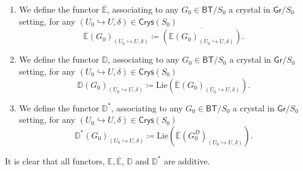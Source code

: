\begin{defn}[]\leavevmode\vspace{-.2\baselineskip}
\begin{enumerate}
\item We define the functor $\overline{\mathbb{E}}$, associating to
	any $G_0 \in \mathsf{BT}/S_0$ a crystal in $\mathsf{Gr}/S_0$
	setting, for any $\left(U_0 \hookrightarrow U, \delta\right) \in \mathsf{Crys}(S_0)$
	\begin{equation*}
		\overline{\mathbb{E}}(G_0)_{\left(U_0 \hookrightarrow U, \delta\right)} \coloneqq
		\overline{\left( \mathbb{E}(G_0)_{\left(U_0 \hookrightarrow U, \delta\right)} \right)}
	.\end{equation*}

\item We define the functor $\mathbb{D}$, associating to
	any $G_0 \in \mathsf{BT}/S_0$ a crystal in $\mathsf{Gr}/S_0$
	setting, for any $\left(U_0 \hookrightarrow U, \delta\right) \in \mathsf{Crys}(S_0)$
	\begin{equation*}
		\mathbb{D}(G_0)_{\left(U_0 \hookrightarrow U, \delta\right)} \coloneqq
		\mathrm{Lie}
		\left( \overline{\mathbb{E}}(G_0)_{\left(U_0 \hookrightarrow U, \delta\right)} \right)
	.\end{equation*}

\item We define the functor $\mathbb{D}^*$, associating to
	any $G_0 \in \mathsf{BT}/S_0$ a crystal in $\mathsf{Gr}/S_0$
	setting, for any $\left(U_0 \hookrightarrow U, \delta\right) \in \mathsf{Crys}(S_0)$
	\begin{equation*}
		\mathbb{D}^*(G_0)_{\left(U_0 \hookrightarrow U, \delta\right)} \coloneqq
		\mathrm{Lie}
		\left( \overline{\mathbb{E}}(G_0^D)_{\left(U_0 \hookrightarrow U, \delta\right)} \right)
	.\end{equation*}
\end{enumerate}
\end{defn}


\begin{rem}[]
	It is clear that all functors, $\mathbb{E}, \overline{\mathbb{E}}$,
	$\mathbb{D}$ and $\mathbb{D}^*$ are additive.
\end{rem}


